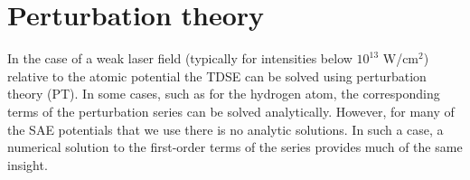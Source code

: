 \section{Perturbation theory} %
\label{sec:perturbation_theory}
In the case of a weak laser field (typically for intensities below $10^{13}$ W/cm$^2$) relative to the atomic potential the TDSE can be solved using perturbation theory (PT). In some cases, such as for the hydrogen atom, the corresponding terms of the perturbation series can be solved analytically. However, for many of the SAE potentials that we use there is no analytic solutions. In such a case, a numerical solution to the first-order terms of the series provides much of the same insight. 

